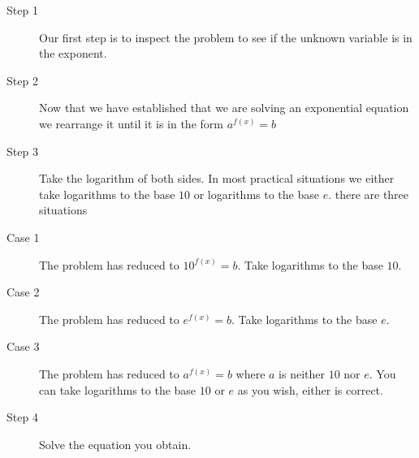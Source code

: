 \begin{description}
	\item [Step 1] Our first step is to inspect the problem to see if the unknown
	variable is in the exponent. 
	
	\item [Step 2] Now that we have
	established that we are solving an exponential equation we rearrange it until it is in the form $a^{f (x)} =b$ 
	
	\item [Step 3] Take the logarithm
	of both sides. In most practical situations we either take logarithms to the base $10$ or logarithms to the base $e$. there are three situations 
	
	\item [Case
	1] The problem has reduced to $10^{f (x)} =b$. Take logarithms to the base $10$. 
	
	\item [Case 2] The problem has
	reduced to $e^{f (x)} =b$. Take logarithms to the base $e$. 
	
	\item [Case 3] The problem has
	reduced to $a^{f (x)} =b$ where $a$ is neither $10$ nor $e$. You can take logarithms to the base $10$ or $e$ as you wish, either is correct. 
	
	\item [Step 4]
	Solve the equation you obtain. \end{description}

